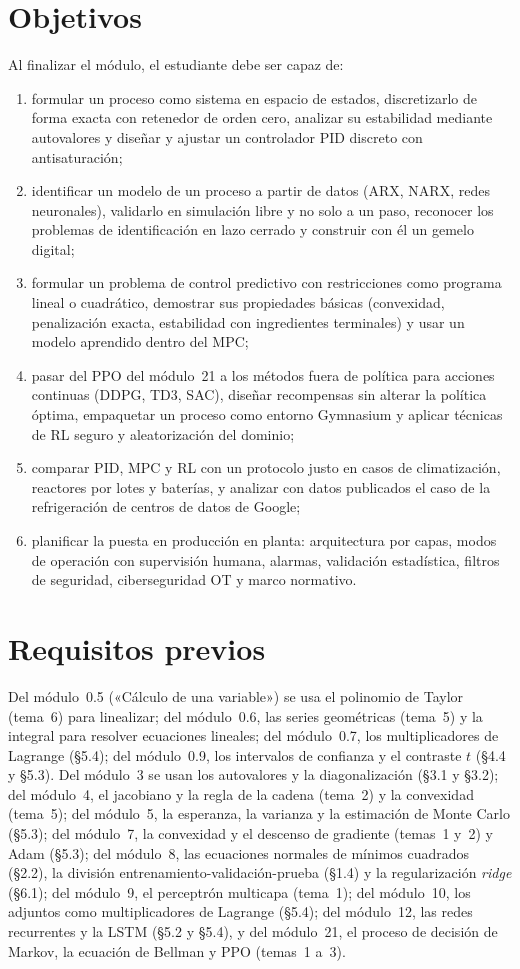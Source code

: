 \documentclass[11pt,a4paper,twoside,openany]{book}
\begin{document}
\section*{Objetivos}
Al finalizar el módulo, el estudiante debe ser capaz de:
\begin{enumerate}[label=\arabic*.]
  \item formular un proceso como sistema en espacio de estados, discretizarlo de forma exacta con retenedor de orden cero, analizar su estabilidad mediante autovalores y diseñar y ajustar un controlador PID discreto con antisaturación;
  \item identificar un modelo de un proceso a partir de datos (ARX, NARX, redes neuronales), validarlo en simulación libre y no solo a un paso, reconocer los problemas de identificación en lazo cerrado y construir con él un gemelo digital;
  \item formular un problema de control predictivo con restricciones como programa lineal o cuadrático, demostrar sus propiedades básicas (convexidad, penalización exacta, estabilidad con ingredientes terminales) y usar un modelo aprendido dentro del MPC;
  \item pasar del PPO del módulo~21 a los métodos fuera de política para acciones continuas (DDPG, TD3, SAC), diseñar recompensas sin alterar la política óptima, empaquetar un proceso como entorno Gymnasium y aplicar técnicas de RL seguro y aleatorización del dominio;
  \item comparar PID, MPC y RL con un protocolo justo en casos de climatización, reactores por lotes y baterías, y analizar con datos publicados el caso de la refrigeración de centros de datos de Google;
  \item planificar la puesta en producción en planta: arquitectura por capas, modos de operación con supervisión humana, alarmas, validación estadística, filtros de seguridad, ciberseguridad OT y marco normativo.
\end{enumerate}

\section*{Requisitos previos}
Del módulo~0.5 («Cálculo de una variable») se usa el polinomio de Taylor (tema~6) para linealizar; del módulo~0.6, las series geométricas (tema~5) y la integral para resolver ecuaciones lineales; del módulo~0.7, los multiplicadores de Lagrange (§5.4); del módulo~0.9, los intervalos de confianza y el contraste $t$ (§4.4 y §5.3). Del módulo~3 se usan los autovalores y la diagonalización (§3.1 y §3.2); del módulo~4, el jacobiano y la regla de la cadena (tema~2) y la convexidad (tema~5); del módulo~5, la esperanza, la varianza y la estimación de Monte Carlo (§5.3); del módulo~7, la convexidad y el descenso de gradiente (temas~1 y~2) y Adam (§5.3); del módulo~8, las ecuaciones normales de mínimos cuadrados (§2.2), la división entrenamiento-validación-prueba (§1.4) y la regularización \emph{ridge} (§6.1); del módulo~9, el perceptrón multicapa (tema~1); del módulo~10, los adjuntos como multiplicadores de Lagrange (§5.4); del módulo~12, las redes recurrentes y la LSTM (§5.2 y §5.4), y del módulo~21, el proceso de decisión de Markov, la ecuación de Bellman y PPO (temas~1 a~3).
\end{document}
